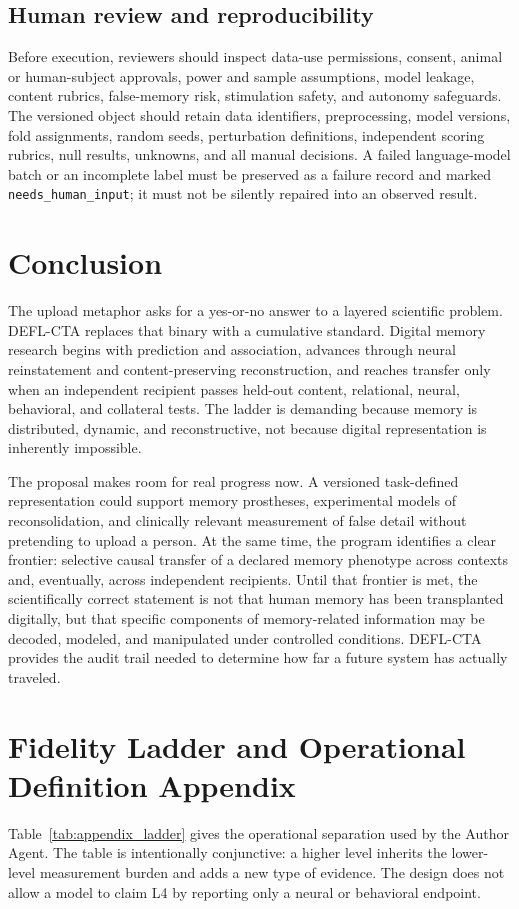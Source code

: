 \documentclass[conference]{IEEEtran}
\begin{document}
\subsection{Human review and reproducibility}
Before execution, reviewers should inspect data-use permissions, consent, animal or human-subject approvals, power and sample assumptions, model leakage, content rubrics, false-memory risk, stimulation safety, and autonomy safeguards. The versioned object should retain data identifiers, preprocessing, model versions, fold assignments, random seeds, perturbation definitions, independent scoring rubrics, null results, unknowns, and all manual decisions. A failed language-model batch or an incomplete label must be preserved as a failure record and marked \texttt{needs\_human\_input}; it must not be silently repaired into an observed result.

\section{Conclusion}
The upload metaphor asks for a yes-or-no answer to a layered scientific problem. DEFL-CTA replaces that binary with a cumulative standard. Digital memory research begins with prediction and association, advances through neural reinstatement and content-preserving reconstruction, and reaches transfer only when an independent recipient passes held-out content, relational, neural, behavioral, and collateral tests. The ladder is demanding because memory is distributed, dynamic, and reconstructive, not because digital representation is inherently impossible.

The proposal makes room for real progress now. A versioned task-defined representation could support memory prostheses, experimental models of reconsolidation, and clinically relevant measurement of false detail without pretending to upload a person. At the same time, the program identifies a clear frontier: selective causal transfer of a declared memory phenotype across contexts and, eventually, across independent recipients. Until that frontier is met, the scientifically correct statement is not that human memory has been transplanted digitally, but that specific components of memory-related information may be decoded, modeled, and manipulated under controlled conditions. DEFL-CTA provides the audit trail needed to determine how far a future system has actually traveled.

\appendices
\section{Fidelity Ladder and Operational Definition Appendix}
Table~\ref{tab:appendix_ladder} gives the operational separation used by the Author Agent. The table is intentionally conjunctive: a higher level inherits the lower-level measurement burden and adds a new type of evidence. The design does not allow a model to claim L4 by reporting only a neural or behavioral endpoint.
\end{document}
